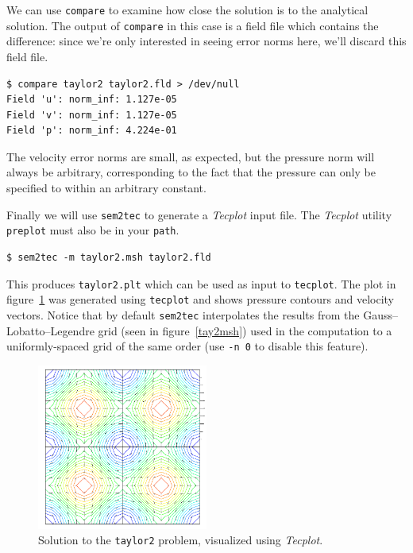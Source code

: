 \documentclass[11pt]{report}
\begin{document}
We can use \texttt{compare} to examine how close the solution is to the
analytical solution.  The output of \texttt{compare} in this case
is a field file which contains the difference: since we're only interested
in seeing error norms here, we'll discard this field file.
{\small
\begin{verbatim}
$ compare taylor2 taylor2.fld > /dev/null
Field 'u': norm_inf: 1.127e-05
Field 'v': norm_inf: 1.127e-05
Field 'p': norm_inf: 4.224e-01
\end{verbatim}
}
\noindent
The velocity error norms are small, as expected, but the pressure norm
will always be arbitrary, corresponding to the fact that the pressure
can only be specified to within an arbitrary constant.

Finally we will use \texttt{sem2tec} to generate a \emph{Tecplot}
input file.  The \emph{Tecplot} utility \texttt{preplot} must also be
in your \texttt{path}.  {\small
\begin{verbatim}
$ sem2tec -m taylor2.msh taylor2.fld
\end{verbatim}
}
\noindent
This produces \texttt{taylor2.plt} which can be used as input to
\texttt{tecplot}.  The plot in figure~\ref{tay2soln} was generated
using \texttt{tecplot} and shows pressure contours and velocity
vectors.  Notice that by default \texttt{sem2tec} interpolates the
results from the Gauss--Lobatto--Legendre grid (seen in
figure~\ref{tay2msh}) used in the computation to a uniformly-spaced
grid of the same order (use \verb|-n 0| to disable this feature).
\begin{figure}
\begin{center}
\includegraphics[width=0.5\textwidth]{taylor2}
\end{center}
\caption{
\label{tay2soln}
  Solution to the \texttt{taylor2} problem, visualized using \emph{Tecplot}.
}
\end{figure}

\end{document}
